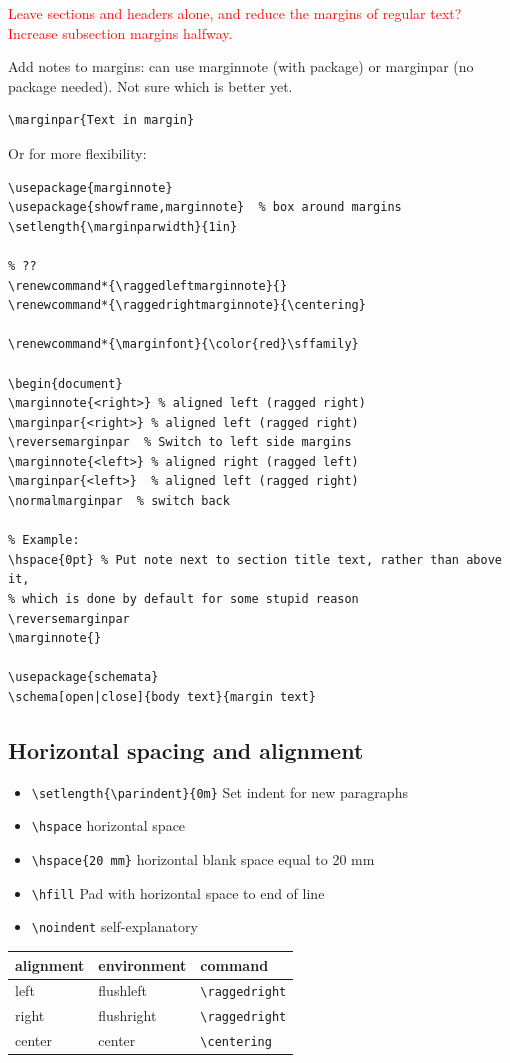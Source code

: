 \documentclass{article}
\begin{document}
\textcolor{red}{Leave sections and headers alone, and reduce the margins of
regular text? Increase subsection margins halfway.}

Add notes to margins: can use marginnote (with package) or marginpar
(no package needed). Not sure which is better yet.
\begin{lstlisting}
\marginpar{Text in margin}
\end{lstlisting}
Or for more flexibility:
\begin{lstlisting}
\usepackage{marginnote}
\usepackage{showframe,marginnote}  % box around margins
\setlength{\marginparwidth}{1in}

% ??
\renewcommand*{\raggedleftmarginnote}{}
\renewcommand*{\raggedrightmarginnote}{\centering}

\renewcommand*{\marginfont}{\color{red}\sffamily}

\begin{document}
\marginnote{<right>} % aligned left (ragged right)
\marginpar{<right>} % aligned left (ragged right)
\reversemarginpar  % Switch to left side margins
\marginnote{<left>} % aligned right (ragged left)
\marginpar{<left>}  % aligned left (ragged right)
\normalmarginpar  % switch back

% Example:
\hspace{0pt} % Put note next to section title text, rather than above it,
% which is done by default for some stupid reason
\reversemarginpar
\marginnote{}

\usepackage{schemata}
\schema[open|close]{body text}{margin text}
\end{lstlisting}


\subsection{Horizontal spacing and alignment}
\begin{itemize}
    \item \verb|\setlength{\parindent}{0m}| Set indent for new paragraphs
    \item \verb|\hspace| horizontal space
    \item \verb|\hspace{20 mm}| horizontal blank space equal to 20 mm
    \item \verb|\hfill| Pad with horizontal space to end of line
    \item \verb|\noindent| self-explanatory
\end{itemize}

\begin{tabular}{l l l}
    alignment & environment & command\\
    \hline
    left & flushleft & \verb|\raggedright|\\
    right & flushright & \verb|\raggedright|\\
    center & center & \verb|\centering|\\
\end{tabular}
\end{document}
